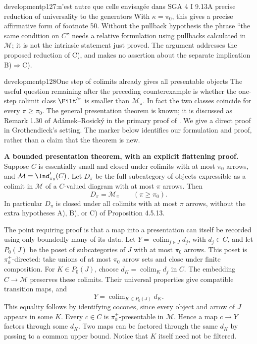 \begin{dcomment}{development}{p127:n'est autre que celle envisagée dans SGA 4 I 9.13}{A precise reduction of universality to the generators}
With $\kappa=\pi_0$, this gives a precise affirmative form of footnote 50. Without the pullback hypothesis the phrase ``the same condition on $C$'' needs a relative formulation using pullbacks calculated in $\mathcal M$; it is not the intrinsic statement just proved. The argument addresses the proposed reduction of C), and makes no assertion about the separate implication B)$\Rightarrow$C).
\end{dcomment}


\begin{dcomment}{development}{p128}{One step of colimits already gives all presentable objects}
The useful question remaining after the preceding counterexample is whether the one-step colimit class $\Filt'^\pi$ is smaller than $\mathcal M_\pi$. In fact the two classes coincide for every $\pi\geq\pi_0$. The general presentation theorem is known; it is discussed as Remark 1.30 of Ad\'amek--Rosick\'y in the primary proof of \citet{Barton2019Presentable}. We give a direct proof in Grothendieck's setting. The marker below identifies our formulation and proof, rather than a claim that the theorem is new.

\textbf{A bounded presentation theorem, with an explicit flattening proof.}\ours{}
Suppose $C$ is essentially small and closed under colimits with at most $\pi_0$ arrows, and $\mathcal M=\Ind'_{\pi_0}(C)$. Let $D_\pi$ be the full subcategory of objects expressible as a colimit in $\mathcal M$ of a $C$-valued diagram with at most $\pi$ arrows. Then
\[
 D_\pi=\mathcal M_\pi\qquad(\pi\geq\pi_0).
\]
In particular $D_\pi$ is closed under all colimits with at most $\pi$ arrows, without the extra hypotheses A), B), or C) of Proposition 4.5.13.

The point requiring proof is that a map into a presentation can itself be recorded using only boundedly many of its data. Let $Y=\operatorname{colim}_{j\in J}d_j$, with $d_j\in C$, and let $P_0(J)$ be the poset of subcategories of $J$ with at most $\pi_0$ arrows. This poset is $\pi_0^+$-directed: take unions of at most $\pi_0$ arrow sets and close under finite composition. For $K\in P_0(J)$, choose $d_K=\operatorname{colim}_K d_j$ in $C$. The embedding $C\to\mathcal M$ preserves these colimits. Their universal properties give compatible transition maps, and
\[
 Y=\operatorname{colim}_{K\in P_0(J)}d_K.
\]
This equality follows by identifying cocones, since every object and arrow of $J$ appears in some $K$. Every $c\in C$ is $\pi_0^+$-presentable in $\mathcal M$. Hence a map $c\to Y$ factors through some $d_K$. Two maps can be factored through the same $d_K$ by passing to a common upper bound. Notice that $K$ itself need not be filtered.


\end{dcomment}
